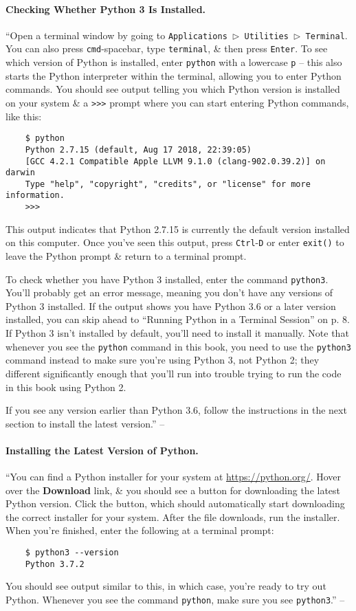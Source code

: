 \documentclass[oneside]{book}
\numberwithin{equation}{section}
\begin{document}
\paragraph{Checking Whether Python 3 Is Installed.} ``Open a terminal window by going to \texttt{Applications $\triangleright$ Utilities $\triangleright$ Terminal}. You can also press \texttt{cmd}-spacebar, type \texttt{terminal}, \& then press \texttt{Enter}. To see which version of Python is installed, enter \texttt{python} with a lowercase \texttt{p} -- this also starts the Python interpreter within the terminal, allowing you to enter Python commands. You should see output telling you which Python version is installed on your system \& a \texttt{>>>} prompt where you can start entering Python commands, like this:
\begin{verbatim}
	$ python
	Python 2.7.15 (default, Aug 17 2018, 22:39:05)
	[GCC 4.2.1 Compatible Apple LLVM 9.1.0 (clang-902.0.39.2)] on darwin
	Type "help", "copyright", "credits", or "license" for more information.
	>>>
\end{verbatim}
This output indicates that Python 2.7.15 is currently the default version installed on this computer. Once you've seen this output, press \texttt{Ctrl}-\texttt{D} or enter \texttt{exit()} to leave the Python prompt \& return to a terminal prompt.

To check whether you have Python 3 installed, enter the command \texttt{python3}. You'll probably get an error message, meaning you don't have any versions of Python 3 installed. If the output shows you have Python 3.6 or a later version installed, you can skip ahead to ``Running Python in a Terminal Session'' on p. 8. If Python 3 isn't installed by default, you'll need to install it manually. Note that whenever you see the \texttt{python} command in this book, you need to use the \texttt{python3} command instead to make sure you're using Python 3, not Python 2; they different significantly enough that you'll run into trouble trying to run the code in this book using Python 2.

If you see any version earlier than Python 3.6, follow the instructions in the next section to install the latest version.'' -- \cite[p. 7]{Matthes2019}

\paragraph{Installing the Latest Version of Python.} ``You can find a Python installer for your system at \url{https://python.org/}. Hover over the \textbf{Download} link, \& you should see a button for downloading the latest Python version. Click the button, which should automatically start downloading the correct installer for your system. After the file downloads, run the installer. When you're finished, enter the following at a terminal prompt:
\begin{verbatim}
	$ python3 --version
	Python 3.7.2
\end{verbatim}
You should see output similar to this, in which case, you're ready to try out Python. Whenever you see the command \texttt{python}, make sure you see \texttt{python3}.'' -- \cite[pp. 7--8]{Matthes2019}
\end{document}
